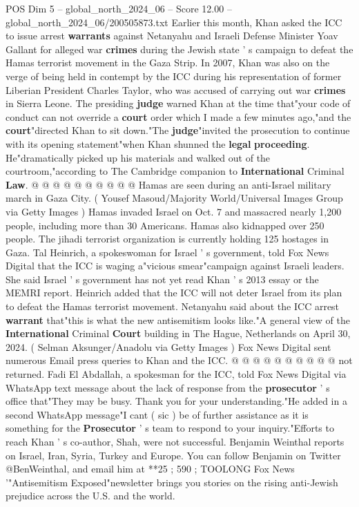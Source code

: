 \begin{textsample}{POS Dim 5 – global\_north\_2024\_06 – Score 12.00 – global\_north\_2024\_06/200505873.txt}
Earlier this month, Khan asked the ICC to issue arrest \textbf{warrants} against Netanyahu and Israeli Defense Minister Yoav Gallant for alleged war \textbf{crimes} during the Jewish state ' s campaign to defeat the Hamas terrorist movement in the Gaza Strip.
In 2007, Khan was also on the verge of being held in contempt by the ICC during his representation of former Liberian President Charles Taylor, who was accused of carrying out war \textbf{crimes} in Sierra Leone.
The presiding \textbf{judge} warned Khan at the time that"your code of conduct can not override a \textbf{court} order which I made a few minutes ago,"and the \textbf{court}"directed Khan to sit down."The \textbf{judge}"invited the prosecution to continue with its opening statement"when Khan shunned the \textbf{legal} \textbf{proceeding}.
He"dramatically picked up his materials and walked out of the courtroom,"according to The Cambridge companion to \textbf{International} Criminal \textbf{Law}. @ @ @ @ @ @ @ @ @ @ Hamas are seen during an anti-Israel military march in Gaza City. ( Yousef Masoud/Majority World/Universal Images Group via Getty Images ) Hamas invaded Israel on Oct. 7 and massacred nearly 1,200 people, including more than 30 Americans.
Hamas also kidnapped over 250 people.
The jihadi terrorist organization is currently holding 125 hostages in Gaza.
Tal Heinrich, a spokeswoman for Israel ' s government, told Fox News Digital that the ICC is waging a"vicious smear"campaign against Israeli leaders.
She said Israel ' s government has not yet read Khan ' s 2013 essay or the MEMRI report.
Heinrich added that the ICC will not deter Israel from its plan to defeat the Hamas terrorist movement.
Netanyahu said about the ICC arrest \textbf{warrant} that"this is what the new antisemitism looks like."A general view of the \textbf{International} Criminal \textbf{Court} building in The Hague, Netherlands on April 30, 2024. ( Selman Aksunger/Anadolu via Getty Images ) Fox News Digital sent numerous Email press queries to Khan and the ICC. @ @ @ @ @ @ @ @ @ @ not returned.
Fadi El Abdallah, a spokesman for the ICC, told Fox News Digital via WhatsApp text message about the lack of response from the \textbf{prosecutor} ' s office that"They may be busy.
Thank you for your understanding."He added in a second WhatsApp message"I cant ( sic ) be of further assistance as it is something for the \textbf{Prosecutor} ' s team to respond to your inquiry."Efforts to reach Khan ' s co-author, Shah, were not successful.
Benjamin Weinthal reports on Israel, Iran, Syria, Turkey and Europe.
You can follow Benjamin on Twitter @BenWeinthal, and email him at **25 ; 590 ; TOOLONG Fox News '"Antisemitism Exposed"newsletter brings you stories on the rising anti-Jewish prejudice across the U.S. and the world.

\end{textsample}
